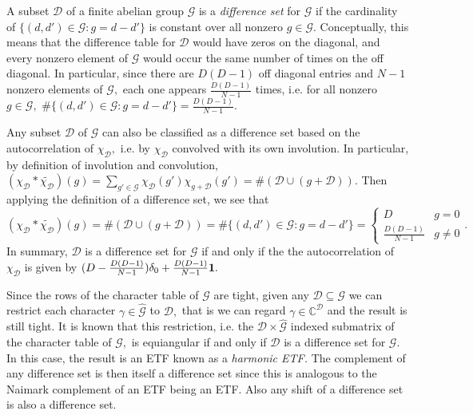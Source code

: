 \documentclass[3p,11pt]{elsarticle}
\newcommand{\bbC}{\mathbb{C}}
\newcommand{\bbF}{\mathbb{F}}
\newcommand{\bfone}{\boldsymbol{1}}
\newcommand{\calD}{\mathcal{D}}
\newcommand{\calG}{\mathcal{G}}
\newcommand{\tr}{\operatorname{tr}}
\theoremstyle{definition}
\begin{document}
A subset $\calD$ of a finite abelian group $\calG$ is a \textit{difference set} for $\calG$ if the cardinality of $\{(d,d')\in\calG: g=d-d'\}$ is constant over all nonzero $g\in\calG.$ Conceptually, this means that the difference table for $\calD$ would have zeros on the diagonal, and every nonzero element of $\calG$ would occur the same number of times on the off diagonal. In particular, since there are $D(D-1)$ off diagonal entries and $N-1$ nonzero elements of $\calG,$ each one appears $\tfrac{D(D-1)}{N-1}$ times, i.e. for all nonzero $g\in\calG,$ $\#\{(d,d')\in\calG: g=d-d'\}=\tfrac{D(D-1)}{N-1}$.

Any subset $\calD$ of $\calG$ can also be classified as a difference set based on the autocorrelation of $\chi_\calD,$ i.e. by $\chi_\calD$ convolved with its own involution. In particular, by definition of involution and convolution, $(\chi_\calD*\tilde{\chi_\calD})(g)=\sum_{g'\in\calG}\chi_{\calD}(g')\chi_{g+\calD}(g')=\#(\calD\cup(g+\calD)).$ Then applying the definition of a difference set, we see that 
\begin{equation*}
    (\chi_\calD*\tilde{\chi_\calD})(g)=\#(\calD\cup(g+\calD))=\#\{(d,d')\in\calG: g=d-d'\}=\left\{\begin{array}{lc}
    D & g=0 \\
    \tfrac{D(D-1)}{N-1} & g\not=0 
    \end{array}\right..
\end{equation*}
In summary, $\calD$ is a difference set for $\calG$ if and only if the the autocorrelation of $\chi_\calD$ is given by $\smash{(D-\tfrac{D(D-1)}{N-1})\delta_0+\tfrac{D(D-1)}{N-1}\bfone}.$

Since the rows of the character table of $\calG$ are tight, given any $\calD\subseteq\calG$ we can restrict each character $\gamma\in\hat{\calG}$ to $\calD,$ that is we can regard $\gamma\in\bbC^\calD$ and the result is still tight. It is known that this restriction, i.e. the $\calD\times\hat{\calG}$ indexed submatrix of the character table of $\calG,$ is equiangular if and only if $\calD$ is a difference set for $\calG.$ In this case, the result is an ETF known as a \textit{harmonic ETF.} The complement of any difference set is then itself a difference set since this is analogous to the Naimark complement of an ETF being an ETF. Also any shift of a difference set is also a difference set.



\end{document}
